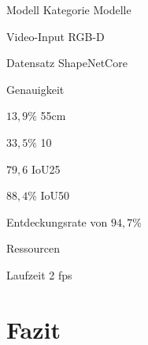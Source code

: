 \documentclass[a4paper, 11pt]{article}
\begin{document}
\begin{multicols*}{2}
    \begin{description*}
        \item[Modell] Kategorie Modelle
        \item[Video-Input] RGB-D
        \item[Datensatz] \Gls{ShapeNetCore}
        \item[Genauigkeit]
        \begin{itemize*}
            \item $13,9\%$ \Gls{55cm}
            \item $33,5\%$ 10\textdegree 5cm
            \item $79,6$ \Gls{IoU25}
            \item $88,4\%$ IoU50
            \item Entdeckungsrate von $94,7\%$
            \item
        \end{itemize*}
        \item[Ressourcen]
        \item[Laufzeit] 2 fps
    \end{description*}


    \section{Fazit}

\end{multicols*}
\end{document}
